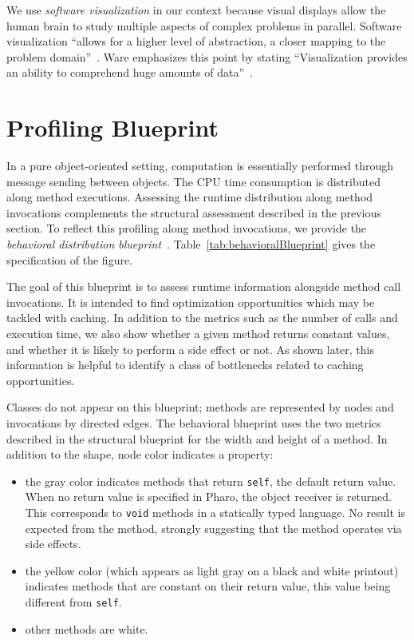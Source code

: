 \documentclass[runningheads]{llncs}
\newcommand{\ct}{\lstinline[backgroundcolor=\color{white},basicstyle=\footnotesize\ttfamily]}
\newcommand{\tabref}[1]{Table~\ref{tab:#1}}
\begin{document}
We use \emph{software visualization} in our context because visual displays allow the human brain to study multiple aspects of complex problems in parallel. Software visualization ``allows for a higher level of abstraction, a closer mapping to the problem domain''~\cite{Petr95a}. Ware emphasizes this point by stating ``Visualization provides an ability to comprehend huge amounts of data''~\cite{Ware00a}. 


\section{Profiling Blueprint}

In a pure object-oriented setting, computation is essentially performed through message sending between objects. The CPU time consumption is distributed along method executions. Assessing the runtime distribution along method invocations complements the structural assessment described in the previous section. To reflect this profiling along method invocations, we provide the \emph{behavioral distribution blueprint}~\cite{Berg10c}. \tabref{behavioralBlueprint} gives the specification of the figure.

The goal of this blueprint is to assess runtime information alongside method call invocations. It is intended to find optimization opportunities which may be tackled with caching. In addition to the metrics such as the number of calls and execution time, we also show whether a given method returns constant values, and whether it is likely to perform a side effect or not. As shown later, this information is helpful to identify a class of bottlenecks related to caching opportunities.

Classes do not appear on this blueprint; methods are represented by nodes and invocations by directed edges. The behavioral blueprint uses the two metrics described in the structural blueprint for the width and height of a method. In addition to the shape, node color indicates a property:
\begin{itemize}
\item the gray color indicates methods that return \ct{self}, the default return value. When no return value is specified in Pharo, the object receiver is returned. This corresponds to \ct{void} methods in a statically typed language. No result is expected from the method, strongly suggesting that the method operates via side effects.
\item the yellow color (which appears as light gray on a black and white printout) indicates methods that are constant on their return value, this value being different from \ct{self}.
\item other methods are white.
\end{itemize}
\end{document}

